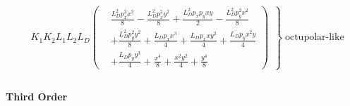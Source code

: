 \footnotesize
\begin{equation}
    \begin{aligned}
      &\left.
      K_1 K_2 L_{1} L_{2} L_{D} \left(
      \begin{aligned}
        &\frac{L_{D}^{2} p_{x}^{2} x^{2}}{8} - \frac{L_{D}^{2} p_{x}^{2} y^{2}}{8} + \frac{L_{D}^{2} p_{x} p_{y} x y}{2} - \frac{L_{D}^{2} p_{y}^{2} x^{2}}{8} \\
        &+ \frac{L_{D}^{2} p_{y}^{2} y^{2}}{8} + \frac{L_{D} p_{x} x^{3}}{4} + \frac{L_{D} p_{x} x y^{2}}{4} + \frac{L_{D} p_{y} x^{2} y}{4} \\
        &+ \frac{L_{D} p_{y} y^{3}}{4} + \frac{x^{4}}{8} + \frac{x^{2} y^{2}}{4} + \frac{y^{4}}{8}
      \end{aligned} \right) \;\,\right\} \; \text{octupolar-like}\\
    \end{aligned}
\end{equation}
\normalsize

\paragraph{Third Order}

